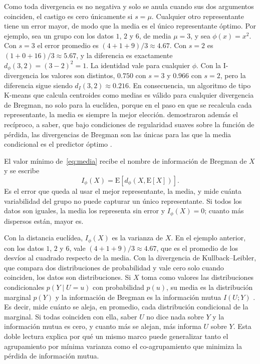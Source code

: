 Como toda divergencia es no negativa y solo se anula cuando sus dos argumentos
coinciden, el castigo es cero únicamente si $s = \mu$. Cualquier otro
representante tiene un error mayor, de modo que la media es el único
representante óptimo. Por ejemplo, sea un grupo con los datos $1$, $2$ y $6$, de
media $\mu = 3$, y sea $\phi(x) = x^2$. Con $s = 3$ el error promedio es
$(4 + 1 + 9)/3 \approx 4.67$. Con $s = 2$ es $(1 + 0 + 16)/3 \approx 5.67$, y la
diferencia es exactamente $d_\phi(3, 2) = (3 - 2)^2 = 1$. La identidad vale para
cualquier $\phi$. Con la I-divergencia los valores son distintos, $0.750$ con
$s = 3$ y $0.966$ con $s = 2$, pero la diferencia sigue siendo
$d_I(3, 2) \approx 0.216$. En consecuencia, un algoritmo de tipo K-means que
calcula centroides como medias es válido para cualquier divergencia de Bregman,
no solo para la euclídea, porque en el paso en que se recalcula cada
representante, la media es siempre la mejor elección. \citet{Banerjee2005opt}
demostraron además el recíproco, a saber, que bajo condiciones de regularidad
suaves sobre la función de pérdida, las divergencias de Bregman son las únicas
para las que la media condicional es el predictor óptimo
\citep[Teoremas~3 y~4]{Banerjee2005opt}.

El valor mínimo de~\eqref{eq:media} recibe el nombre de información de
Bregman de $X$ y se escribe
\begin{equation}\label{eq:info-bregman}
  I_\phi(X) = \mathrm{E}[d_\phi(X, \mathrm{E}[X])].
\end{equation}
Es el error que queda al usar el mejor representante, la media, y mide cuánta
variabilidad del grupo no puede capturar un único representante. Si todos los
datos son iguales, la media los representa sin error y $I_\phi(X) = 0$; cuanto
más dispersos están, mayor es.

Con la distancia euclídea, $I_\phi(X)$ es la varianza de $X$. En el ejemplo
anterior, con los datos $1$, $2$ y $6$, vale $(4 + 1 + 9)/3 \approx 4.67$, que es
el promedio de los desvíos al cuadrado respecto de la media. Con la divergencia
de Kullback--Leibler, que compara dos distribuciones de probabilidad y vale cero
solo cuando coinciden, los datos son distribuciones. Si $X$ toma como valores las
distribuciones condicionales $p(Y \mid U = u)$ con probabilidad $p(u)$, su media
es la distribución marginal $p(Y)$ y la información de Bregman es la
información mutua $I(U;Y)$ \citep{Banerjee2005}. Es decir, mide cuánto se aleja,
en promedio, cada distribución condicional de la marginal. Si todas coinciden con
ella, saber $U$ no dice nada sobre $Y$ y la información mutua es cero, y cuanto
más se alejan, más informa $U$ sobre $Y$. Esta
doble lectura explica por qué
un mismo marco puede generalizar tanto el agrupamiento por mínima varianza como el
co-agrupamiento que minimiza la pérdida de información mutua.


